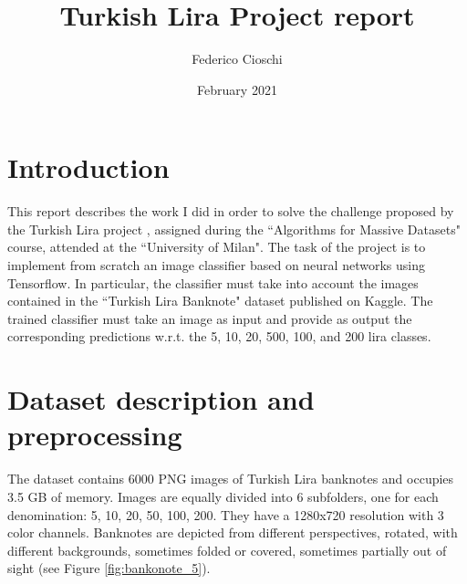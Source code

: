 \documentclass{article}
\title{Turkish Lira Project report}
\author{Federico Cioschi}
\affil{Università degli Studi di Milano}
\date{February 2021}
\begin{document}
\maketitle

\newpage

\section{Introduction}
This report describes the work I did in order to solve the challenge proposed by the Turkish Lira project \cite{assignment}, assigned during the ``Algorithms for Massive Datasets" course, attended at the ``University of Milan".
The task of the project is to implement from scratch an image classifier based on neural networks using Tensorflow.
In particular, the classifier must take into account the images contained in the ``Turkish Lira Banknote" dataset \cite{dataset} published on Kaggle. The trained classifier must take an image as input and provide as output the corresponding predictions w.r.t. the 5, 10, 20, 500, 100, and 200 lira classes.


\section{Dataset description and preprocessing}
The dataset contains 6000 PNG images of Turkish Lira banknotes and occupies 3.5 GB of memory.
Images are equally divided into 6 subfolders, one for each denomination: 5, 10, 20, 50, 100, 200.
They have a 1280x720 resolution with 3 color channels.
Banknotes are depicted from different perspectives, rotated, with different backgrounds, sometimes folded or covered, sometimes partially out of sight (see Figure \ref{fig:bankonote_5}).
\end{document}
